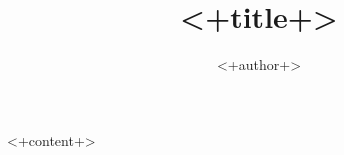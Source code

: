 \documentclass[article,twoside]{memoir}
\title{<+title+>}
\author{<+author+>}
\begin{document}
<+content+>
\end{document}
